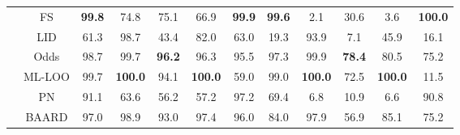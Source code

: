 \documentclass[varwidth=\maxdimen]{standalone}
\begin{document}
\begin{table}
\begin{tabular}{c|c|ccccc|ccccc}
                                                   & FS                                                    & \textbf{99.8}                         & 74.8                              & 75.1                         & 66.9                                  & \textbf{99.9}                        & \textbf{99.6}                & 2.1                       & 30.6                       & 3.6                       & \textbf{100.0}             \\
                                                   & LID                                                   & {\color[HTML]{DC257F}61.3}            & 98.7                              & 43.4                         & 82.0                                  & 63.0                                 & {\color[HTML]{DC257F}19.3}   & 93.9                      & 7.1                        & 45.9                      & 16.1                       \\
                                                   & Odds                                                  & 98.7                                  & 99.7                              & \textbf{96.2}                & 96.3                                  & 95.5                                 & 97.3                         & 99.9                      & \textbf{78.4}              & 80.5                      & 75.2                       \\
                                                   & ML-LOO                                                & 99.7                                  & \textbf{100.0}                    & 94.1                         & \textbf{100.0}                        & {\color[HTML]{DC257F}59.0}           & 99.0                         & \textbf{100.0}            & 72.5                       & \textbf{100.0}            & {\color[HTML]{DC257F}11.5} \\
                                                   & PN                                                    & 91.1                                  & 63.6                              & 56.2                         & 57.2                                  & 97.2                                 & 69.4                         & 6.8                       & 10.9                       & 6.6                       & 90.8                       \\ \rowcolor{Gray}
                                                   & BAARD                                                 & 97.0                                  & 98.9                              & 93.0                         & 97.4                                  & 96.0                                 & 84.0                         & 97.9                      & 56.9                       & 85.1                      & 75.2                       \\

\end{tabular}
\end{table}
\end{document}
